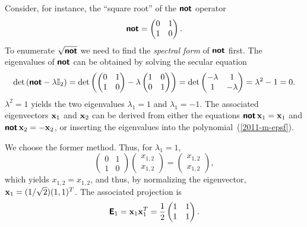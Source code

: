 {Consider, for instance, the ``square root''  of the $\textsf{\textbf{not}}$ operator
\begin{equation}
\textsf{\textbf{not}}
=
\begin{pmatrix}
 0&1\\  1&0
\end{pmatrix}.
\end{equation}
To enumerate $\sqrt{\textsf{\textbf{not}}}$  we need to find the {\em spectral form} of $\textsf{\textbf{not}}$ first.
The eigenvalues of  $\textsf{\textbf{not}}$ can be obtained by solving the
secular equation
\begin{equation}
\text{det}
\left(
\textsf{\textbf{not}} - \lambda {\Bbb I}_2
\right)
=
\text{det}
\left(
\begin{pmatrix}
 0&1\\  1&0
\end{pmatrix}
-
\lambda
\begin{pmatrix}
1&0\\  0&1
\end{pmatrix}
\right)
=
\text{det}
\begin{pmatrix}
 -\lambda&1\\
1&-\lambda
\end{pmatrix}
   =\lambda^2-1=0.
\end{equation}
$\lambda^2=1$ yields the two eigenvalues
$\lambda_1=1$
and
$\lambda_1=-1$.
The associated eigenvectors
${\bf x}_1$
and
${\bf x}_2$
can be derived from either the equations
$\textsf{\textbf{not}}\,{\bf x}_1={\bf x}_1$
and
$\textsf{\textbf{not}}\,{\bf x}_2=-{\bf x}_2$,
or inserting the eigenvalues into the polynomial~(\ref{2011-m-epsf}).

We choose the former method.
Thus, for $\lambda_1=1$,
\begin{equation}
\begin{pmatrix}
 0&1\\  1&0
\end{pmatrix}
\begin{pmatrix}
x_{1,2}\\x_{1,2}
\end{pmatrix}
=\begin{pmatrix}
x_{1,2}\\x_{1,2}
\end{pmatrix}
,
\end{equation}
which yields  $x_{1,2}=x_{1,2}$, and thus, by normalizing the eigenvector,
${\bf x}_1=(1/\sqrt{2})(1,1)^T$.
The associated projection is
\begin{equation}
\textsf{\textbf{E}}_1={\bf x}_1{\bf x}_1^T=\frac{1}{2}
\begin{pmatrix}
 1&1\\  1&1
\end{pmatrix}
.
\end{equation}


}
